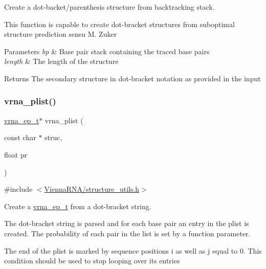 Create a dot-\/backet/parenthesis structure from backtracking stack. 

This function is capable to create dot-\/bracket structures from suboptimal structure prediction sensu M. Zuker


\begin{DoxyParams}{Parameters}
{\em bp} & Base pair stack containing the traced base pairs \\
\hline
{\em length} & The length of the structure \\
\hline
\end{DoxyParams}
\begin{DoxyReturn}{Returns}
The secondary structure in dot-\/bracket notation as provided in the input 
\end{DoxyReturn}
\mbox{\label{group__struct__utils_gaf002d69024d709744664a8b9ca3dd77d}} 
\subsubsection{\texorpdfstring{vrna\+\_\+plist()}{vrna\_plist()}}
{\footnotesize\ttfamily \hyperlink{group__struct__utils_gab9ac98ab55ded9fb90043b024b915aca}{vrna\+\_\+ep\+\_\+t}$\ast$ vrna\+\_\+plist (\begin{DoxyParamCaption}\item[{const char $\ast$}]{struc,  }\item[{float}]{pr }\end{DoxyParamCaption})}



{\ttfamily \#include $<$\hyperlink{structure__utils_8h}{Vienna\+R\+N\+A/structure\+\_\+utils.\+h}$>$}



Create a \hyperlink{group__struct__utils_gab9ac98ab55ded9fb90043b024b915aca}{vrna\+\_\+ep\+\_\+t} from a dot-\/bracket string. 

The dot-\/bracket string is parsed and for each base pair an entry in the plist is created. The probability of each pair in the list is set by a function parameter.

The end of the plist is marked by sequence positions i as well as j equal to 0. This condition should be used to stop looping over its entries


